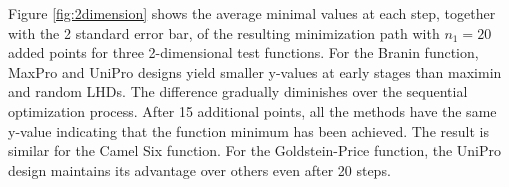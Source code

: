 \documentclass [PhD] {package/uclathes}
\begin{document}
Figure \ref{fig:2dimension} shows the average minimal values at each step, together with the 2 standard error bar, of the resulting minimization path with $n_1=20$ added points for three 2-dimensional test functions.
For the Branin function,  MaxPro and UniPro designs yield smaller y-values at early stages than maximin and random LHDs. The difference gradually diminishes over the sequential optimization process. After 15 additional points, all the methods have the same y-value indicating that the function minimum has been achieved. The result is similar for the Camel Six function. For the Goldstein-Price function, the UniPro design maintains its advantage over others even after 20 steps.







\end{document}

